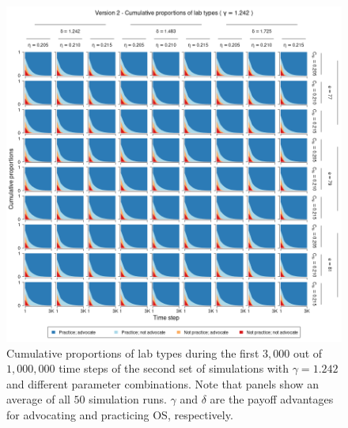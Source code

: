 \documentclass[meta, authordate]{jote-new-article}
\begin{document}
\begin{figure}
  \begin{fullwidth}
    \centering
    \includegraphics[width=\textwidth]{v2_pro_plot_sens_payypro1.242.png}
    \caption{Cumulative proportions of lab types during the first $3,000$ out of $1,000,000$ time steps of the second set of simulations with $\gamma=1.242$ and different parameter combinations. Note that panels show an average of all $50$ simulation runs. $\gamma$ and $\delta$ are the payoff advantages for advocating and practicing OS, respectively.}
    \label{fig:v2_pro_plot_sens_payypro1.242}
  \end{fullwidth}
\end{figure}
%
%
\end{document}

